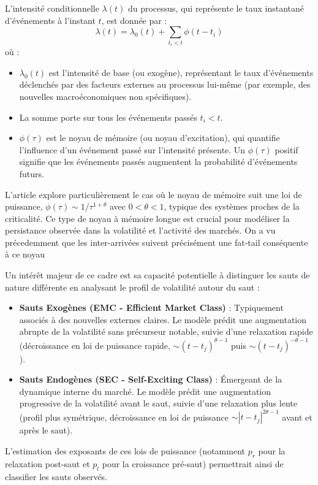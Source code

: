 \documentclass[10pt,a4paper]{article}
\theoremstyle{definition}
\theoremstyle{remark}
\begin{document}
\begin{itemize}
    L'intensité conditionnelle $\lambda(t)$ du processus, qui représente le taux instantané d'événements à l'instant $t$, est donnée par \cite{marcaccioli2021exogenous} :
    \begin{equation}
    \lambda(t) = \lambda_0(t) + \sum_{t_i < t} \phi(t-t_i)
    \end{equation}
    où :
    \begin{itemize}
        \item $\lambda_0(t)$ est l'intensité de base (ou exogène), représentant le taux d'événements déclenchés par des facteurs externes au processus lui-même (par exemple, des nouvelles macroéconomiques non spécifiques).
        \item La somme porte sur tous les événements passés $t_i < t$.
        \item $\phi(\tau)$ est le noyau de mémoire (ou noyau d'excitation), qui quantifie l'influence d'un événement passé sur l'intensité présente. Un $\phi(\tau)$ positif signifie que les événements passés augmentent la probabilité d'événements futurs.
    \end{itemize}

    L'article \cite{marcaccioli2021exogenous} explore particulièrement le cas où le noyau de mémoire suit une loi de puissance, $\phi(\tau) \sim 1/\tau^{1+\theta}$ avec $0 < \theta < 1$, typique des systèmes proches de la criticalité. Ce type de noyau à mémoire longue est crucial pour modéliser la persistance observée dans la volatilité et l'activité des marchés. On a vu précedemment que les inter-arrivées suivent précisément une fat-tail conséquente à ce noyau
    
    Un intérêt majeur de ce cadre est sa capacité potentielle à distinguer les sauts de nature différente en analysant le profil de volatilité autour du saut :
    \begin{itemize}
        \item \textbf{Sauts Exogènes (EMC - Efficient Market Class)} : Typiquement associés à des nouvelles externes claires. Le modèle prédit une augmentation abrupte de la volatilité sans précurseur notable, suivie d'une relaxation rapide (décroissance en loi de puissance rapide, $\sim (t-t_j)^{\theta-1}$ puis $\sim (t-t_j)^{-\theta-1}$).
        \item \textbf{Sauts Endogènes (SEC - Self-Exciting Class)} : Émergeant de la dynamique interne du marché. Le modèle prédit une augmentation progressive de la volatilité avant le saut, suivie d'une relaxation plus lente (profil plus symétrique, décroissance en loi de puissance $\sim |t-t_j|^{2\theta-1}$ avant et après le saut).
    \end{itemize}
    L'estimation des exposants de ces lois de puissance (notamment $p_r$ pour la relaxation post-saut et $p_l$ pour la croissance pré-saut) permettrait ainsi de classifier les sauts observés.


\end{itemize}
\end{document}
